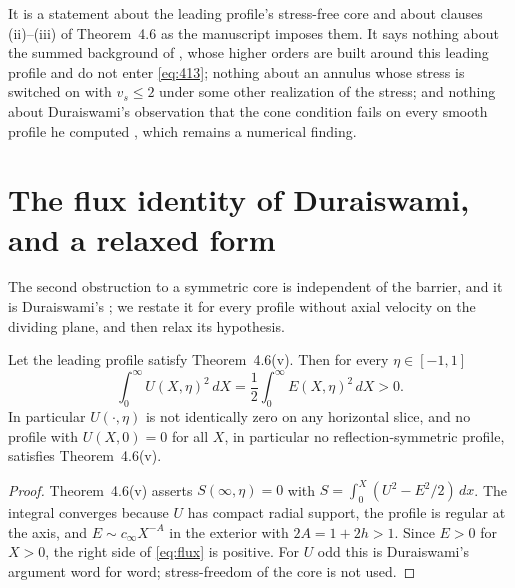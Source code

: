 \documentclass[11pt]{article}
\newcommand{\vs}{v_s}
\begin{document}
\begin{remark}\label{rem:not}
It is a statement about the leading profile's stress-free core and about clauses (ii)--(iii) of Theorem~4.6 as the manuscript imposes them. It says nothing about the summed background of \cite[Section~5]{OpenAINS}, whose higher orders are built around this leading profile and do not enter \eqref{eq:413}; nothing about an annulus whose stress is switched on with $\vs\le2$ under some other realization of the stress; and nothing about Duraiswami's observation that the cone condition fails on every smooth profile he computed \cite[p.~21]{Duraiswami}, which remains a numerical finding.
\end{remark}

\section{The flux identity of Duraiswami, and a relaxed form}\label{sec:flux}

The second obstruction to a symmetric core is independent of the barrier, and it is Duraiswami's \cite[p.~20]{Duraiswami}; we restate it for every profile without axial velocity on the dividing plane, and then relax its hypothesis.

\begin{proposition}[Duraiswami]\label{prop:flux}
Let the leading profile satisfy Theorem~4.6(v). Then for every $\eta\in[-1,1]$
\begin{equation}\label{eq:flux}
\int_0^\infty U(X,\eta)^2\,dX=\frac12\int_0^\infty E(X,\eta)^2\,dX>0 .
\end{equation}
In particular $U(\cdot,\eta)$ is not identically zero on any horizontal slice, and no profile with $U(X,0)=0$ for all $X$, in particular no reflection-symmetric profile, satisfies Theorem~4.6(v).
\end{proposition}

\begin{proof}
Theorem~4.6(v) asserts $S(\infty,\eta)=0$ with $S=\int_0^X(U^2-E^2/2)\,dx$. The integral converges because $U$ has compact radial support, the profile is regular at the axis, and $E\sim c_\infty X^{-A}$ in the exterior with $2A=1+2h>1$. Since $E>0$ for $X>0$, the right side of \eqref{eq:flux} is positive. For $U$ odd this is Duraiswami's argument word for word; stress-freedom of the core is not used.
\end{proof}
\end{document}
